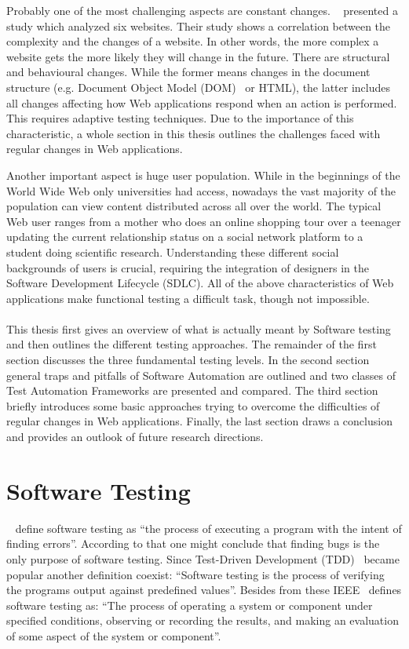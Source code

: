 \documentclass[12pt, notitlepage]{article}
\begin{document}
Probably one of the most challenging aspects are constant changes. ~\citet{html-evolution}
presented a study which analyzed six websites. Their study shows a correlation between the complexity and the changes of
a website. In other words, the more complex a website gets the more likely they will change in the future. 
There are structural and behavioural changes. While the former means changes in the document structure (e.g. Document Object Model (DOM)~\cite{dom} or HTML), the latter
includes all changes affecting how Web applications respond when an action is performed. 
This requires adaptive testing techniques. Due to the importance of this characteristic, a whole section in this thesis outlines the challenges faced
with regular changes in Web applications.
 
Another important aspect is huge user population. While in the beginnings of the World Wide Web only universities had access,
nowadays the vast majority of the population can view content distributed across all over the world. The typical Web user ranges from a
mother who does an online shopping tour over a teenager updating the current relationship status on a social network platform to a student doing scientific research. Understanding these different social backgrounds of users is crucial, requiring the integration of designers in the Software Development Lifecycle (SDLC). All of the
above characteristics of Web applications make functional testing a difficult task, though not impossible.\\\\
This thesis first gives an overview of what is actually meant by Software testing and then outlines the different testing approaches. 
The remainder of the first section discusses the three fundamental testing levels. In the second section general traps and pitfalls of Software Automation are outlined and two classes of Test Automation Frameworks are presented and compared. The third section briefly introduces some basic approaches trying to overcome the difficulties of regular changes in Web applications. Finally, the last section draws a conclusion and provides an outlook of future research directions.
\newpage

\section{Software Testing}
~\citet{art-of-software-testing} define software testing as \enquote{the process of executing a program with the intent of finding errors}.
According to that one might conclude that finding bugs is the only purpose of software testing. Since Test-Driven Development (TDD)~\cite{tdd} became popular
another definition coexist: \enquote{Software testing is the process of verifying the programs output against predefined values}. Besides from 
these IEEE~\cite{ieee-definition} defines software testing as: \enquote{The process of operating a system or component under specified conditions, observing or recording the results, and making an evaluation of some aspect of the system or component}.\\
\end{document}
